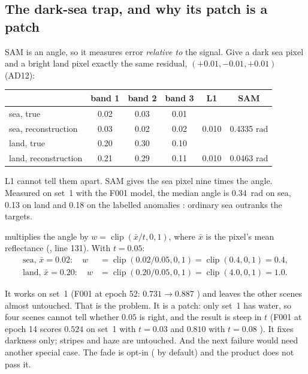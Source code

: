 \subsection{The dark-sea trap, and why its patch is a patch}

SAM is an angle, so it measures error \emph{relative to} the signal. Give a dark sea pixel and a bright land
pixel exactly the same residual, $(+0.01,-0.01,+0.01)$ (AD12):
\begin{center}\small
\begin{tabular}{@{}lccccc@{}}
\toprule
 & band 1 & band 2 & band 3 & L1 & SAM\\
\midrule
sea, true & 0.02 & 0.03 & 0.01 & & \\
sea, reconstruction & 0.03 & 0.02 & 0.02 & 0.010 & 0.4335 rad\\
land, true & 0.20 & 0.30 & 0.10 & & \\
land, reconstruction & 0.21 & 0.29 & 0.11 & 0.010 & 0.0463 rad\\
\bottomrule
\end{tabular}
\end{center}
L1 cannot tell them apart. SAM gives the sea pixel nine times the angle. Measured on set~1 with the F001
model, the median angle is 0.34~rad on sea, 0.13 on land and 0.18 on the labelled
anomalies : ordinary sea outranks the targets.

 multiplies the angle by $w=\operatorname{clip}(\bar{x}/t,0,1)$,
where $\bar{x}$ is the pixel's mean reflectance (, line 131). With $t=0.05$:
\begin{align*}
\text{sea, } \bar x = 0.02:\quad w &= \operatorname{clip}(0.02/0.05,0,1) = \operatorname{clip}(0.4,0,1) = 0.4,\\
\text{land, } \bar x = 0.20:\quad w &= \operatorname{clip}(0.20/0.05,0,1) = \operatorname{clip}(4.0,0,1) = 1.0.
\end{align*}
\begin{sloppypar}
It works on set~1 (F001 at epoch 52: $0.731\to0.887$ )
and leaves the other scenes almost untouched. That is the problem. It is a patch: only set~1 has water,
so four scenes cannot tell whether $0.05$ is right, and the result is steep in $t$ (F001 at epoch 14 scores
$0.524$ on set~1 with $t=0.03$ and $0.810$ with $t=0.08$ ).
It fixes darkness only; stripes and haze are untouched. And the next failure would need another special case.
The fade is opt-in ( by default) and the product does not pass it.
\end{sloppypar}

